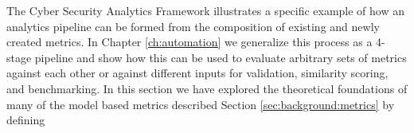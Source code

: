
The Cyber Security Analytics Framework illustrates a specific example of how an analytics pipeline can be formed from the composition of existing and newly created metrics. In Chapter \ref{ch:automation} we generalize this process as a 4-stage pipeline and show how this can be used to evaluate arbitrary sets of metrics against each other or against different inputs for validation, similarity scoring, and benchmarking. In this section we have explored the theoretical foundations of many of the model based metrics described Section \ref{sec:background:metrics} by defining 
